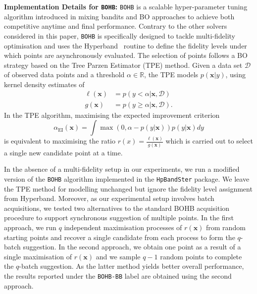 \documentclass[jair,twoside,11pt,theapa]{article}
\let\cite\shortcite
\theoremstyle{definition}
\begin{document}
\noindent \textbf{Implementation Details for \texttt{BOHB}:} \texttt{BOHB} is a scalable hyper-parameter tuning algorithm introduced in \cite{falkner2018bohb} mixing bandits and BO approaches to achieve both competitive anytime and final performance. Contrary to the other solvers considered in this paper, \texttt{BOHB} is specifically designed to tackle multi-fidelity optimisation and uses the Hyperband~\cite{li2017hyperband} routine to define the fidelity levels under which points are asynchronously evaluated. The selection of points follows a BO strategy based on the Tree Parzen Estimator (TPE) method. Given a data set $\mathcal{D}$ of observed data points and a threshold $\alpha\in \mathbb{R}$, the TPE models $p(\bm{x}|y)$, using kernel density estimates of 
\begin{align*}
    \ell(\bm{x}) &= p(y < \alpha|\bm{x}, \mathcal{D}) \\
    g(\bm{x}) &= p(y \geq \alpha | \bm{x},\mathcal{D}). 
\end{align*}
 In the TPE algorithm, maximising the expected improvement criterion
 \begin{equation*}
     \alpha_\text{EI}(\boldsymbol{x}) = \int \max(0, \alpha - p(y|\boldsymbol{x}))  p(y|\boldsymbol{x}) d y
 \end{equation*}  
 is equivalent to maximising the ratio   $r(x) = \tfrac{\ell(\bm{x})}{g(\bm{x})}$  which is carried out to select a single new candidate point at a time.

In the absence of a multi-fidelity setup in our experiments, we run a modified version of the \texttt{BOHB} algorithm implemented in the \texttt{HpBandSter} package. We leave the TPE method for modelling unchanged but ignore the fidelity level assignment from Hyperband. Moreover, as our experimental setup involves batch acquisitions, we tested two alternatives to the standard BOHB acquisition procedure to support synchronous suggestion of multiple points. In the first approach, we run $q$ independent maximisation processes of $r(\bm{x})$ from random starting points and recover a single candidate from each process to form the $q$-batch suggestion. In the second approach, we obtain one point as a result of a single maximisation of $r(\bm{x})$ and we sample $q-1$ random points to complete the $q$-batch suggestion. As the latter method yields better overall performance, the results reported under the \texttt{BOHB-BB} label are obtained using the second approach.
\end{document}
